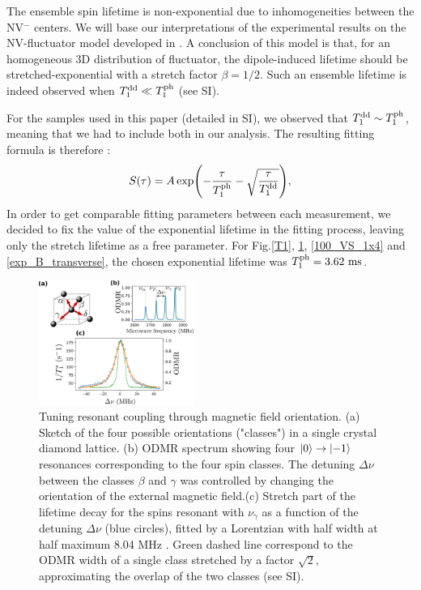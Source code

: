 \documentclass[preprintnumbers,amsmath,amssymb,superscriptaddress,twocolumn,showpacs]{revtex4-2}
\begin{document}
The ensemble spin lifetime is non-exponential due to inhomogeneities between the NV$^-$ centers. We will base our interpretations of the experimental results on the NV-fluctuator model developed in \citep{choi_depolarization_2017}. A conclusion of this model is that, for an homogeneous 3D distribution of fluctuator, the dipole-induced lifetime should be stretched-exponential with a stretch factor $\beta=1/2$. Such an ensemble lifetime is indeed observed when $T_1^{\rm dd} \ll T_1^{\rm ph}$  (see SI).

For the samples used in this paper (detailed in SI), we observed that $T_1^{\rm dd} \sim T_1^{\rm ph}$, meaning that we had to include both  in our analysis. The resulting fitting formula is therefore :
\begin{equation}
S(\tau)=A \exp (-\frac{\tau}{T_1^{\rm ph}} -\sqrt{\frac{\tau}{T_1^{\rm dd}}}),
\end{equation}
In order to get comparable fitting parameters between each measurement, we decided to fix the value of the exponential lifetime in the fitting process, leaving only the stretch lifetime as a free parameter. For Fig.\ref{T1}, \ref{largeur_fluct}, \ref{100_VS_1x4} and \ref{exp_B_transverse}, the chosen exponential lifetime was $T_1^{\rm ph}=3.62 \ \rm ms$.

\begin{figure}
\includegraphics[width=0.45\textwidth]{Figures/fig largeur fluct}
\caption{Tuning resonant coupling through magnetic field orientation. (a) Sketch of the four possible orientations ("classes") in a single crystal diamond lattice. (b) ODMR spectrum showing four $\ket{0} \to \ket{-1}$ resonances corresponding to the four spin classes. The detuning $\Delta \nu$ between the classes $\beta$ and $\gamma$ was controlled by changing the orientation of the external magnetic field.(c) Stretch part of the lifetime decay for the spins resonant with $\nu_\gamma$ as a function of the detuning $\Delta \nu$ (blue circles), fitted by a Lorentzian with half width at half maximum 8.04 MHz . Green dashed line correspond to the ODMR width of a single class stretched by a factor $\sqrt 2$, approximating the overlap of the two classes (see SI).}
\label{largeur_fluct}
\end{figure}
\end{document}
